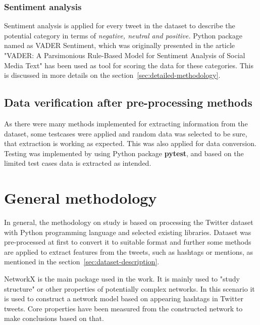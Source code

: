 \documentclass[conference]{IEEEtran}
\begin{document}
    \subsubsection{Sentiment analysis}

    Sentiment analysis is applied for every tweet in the dataset to describe the potential category in terms of \textit{negative, neutral and positive.}
    Python package named as VADER Sentiment, which was originally presented in the article "VADER: A Parsimonious Rule-Based Model for Sentiment Analysis of Social Media Text"\cite{Hutto_Gilbert_2014} has been used as tool for scoring the data for these categories.
    This is discussed in more details on the section~\ref{sec:detailed-methodology}.

    \subsection{Data verification after pre-processing methods}

    As there were many methods implemented for extracting information from the dataset, some testcases were applied
    and random data was selected to be sure, that extraction is working as expected.
    This was also applied for data conversion.
    Testing was implemented by using Python package \textbf{pytest}\cite{pytestx.y}, and based on the limited test cases data is extracted as intended.


    \section{General methodology}\label{sec:general-methodology}

    In general, the methodology on study is based on processing the Twitter dataset with Python programming language and selected existing libraries.
    Dataset was pre-processed at first to convert it to suitable format and further some methods are applied to extract
    features from the tweets, such as hashtags or mentions, as mentioned in the section~\ref{sec:dataset-description}.


    NetworkX\cite{SciPyProceedings_11} is the main package used in the work.
    It is mainly used to "study structure" or other properties of potentially complex networks.
    In this scenario it is used to construct a network model based on appearing hashtags in Twitter tweets.
    Core properties have been measured from the constructed network to make conclusions based on that.
\end{document}
